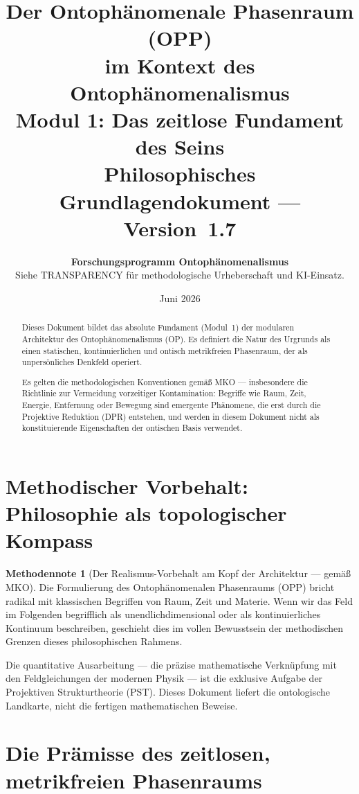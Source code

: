 \documentclass[11pt,a4paper]{article}
\title{
  \textbf{Der Ontoph\"{a}nomenale Phasenraum (OPP)}\\
  \textbf{im Kontext des Ontoph\"{a}nomenalismus}\\[0.4em]
  {\large Modul 1: Das zeitlose Fundament des Seins}\\[0.5em]
  {\normalsize Philosophisches Grundlagendokument --- Version~1.7}
}
\author{
  \textbf{Forschungsprogramm Ontoph\"{a}nomenalismus}\\
  \small Siehe TRANSPARENCY f\"{u}r methodologische Urheberschaft und KI-Einsatz.
}
\date{Juni 2026}
\theoremstyle{plain}
\theoremstyle{definition}
\newtheorem{methodennote}{Methodennote}[section]
\begin{document}
\maketitle

\begin{abstract}
Dieses Dokument bildet das absolute Fundament (Modul~1) der modularen Architektur des
Ontoph\"{a}nomenalismus (OP). Es definiert die Natur des Urgrunds als einen statischen,
kontinuierlichen und ontisch metrikfreien Phasenraum, der als unpers\"{o}nliches Denkfeld
operiert.

Es gelten die methodologischen Konventionen gem\"{a}\ss{} MKO --- insbesondere die
Richtlinie zur Vermeidung vorzeitiger Kontamination: Begriffe wie Raum, Zeit, Energie,
Entfernung oder Bewegung sind emergente Ph\"{a}nomene, die erst durch die Projektive
Reduktion (DPR) entstehen, und werden in diesem Dokument nicht als konstituierende
Eigenschaften der ontischen Basis verwendet.
\end{abstract}

\tableofcontents
\newpage

\section{Methodischer Vorbehalt: Philosophie als topologischer Kompass}

\begin{methodennote}[Der Realismus-Vorbehalt am Kopf der Architektur ---
gem\"{a}\ss{} MKO]
Die Formulierung des Ontoph\"{a}nomenalen Phasenraums (OPP) bricht radikal mit
klassischen Begriffen von Raum, Zeit und Materie. Wenn wir das Feld im Folgenden
begrifflich als \glqq{}unendlichdimensional\grqq{} oder als \glqq{}kontinuierliches
Kontinuum\grqq{} beschreiben, geschieht dies im vollen Bewusstsein der methodischen
Grenzen dieses philosophischen Rahmens.

Die quantitative Ausarbeitung --- die pr\"{a}zise mathematische Verkn\"{u}pfung mit den
Feldgleichungen der modernen Physik --- ist die exklusive Aufgabe der Projektiven
Strukturtheorie (PST). Dieses Dokument liefert die ontologische Landkarte, nicht die
fertigen mathematischen Beweise.
\end{methodennote}

\section{Die Pr\"{a}misse des zeitlosen, metrikfreien Phasenraums}
\end{document}
